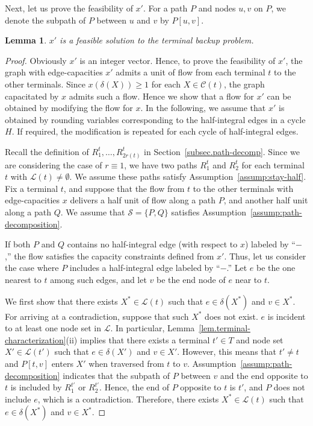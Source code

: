 \documentclass{article}
\newtheorem{lemma}{Lemma}
\newcommand{\Cfam}{\mathcal{C}}
\newcommand{\Lfam}{\mathcal{L}}
\newcommand{\Sfam}{\mathcal{S}}
\begin{document}
Next, let us prove the feasibility of $x'$.
For a path $P$ and nodes $u,v$ on $P$, we denote the subpath of $P$ between
$u$ and $v$ by $P[u,v]$.

\begin{lemma}\label{lem.feasibility-easy}
 $x'$ is a feasible solution to the terminal backup problem.
\end{lemma}
 \begin{proof}
  Obviously $x'$ is an integer vector. Hence, to prove the feasibility
  of $x'$, the graph with edge-capacities $x'$
  admits a unit of flow from each terminal $t$ to the other terminals.
  Since $x(\delta(X)) \geq 1$ for each $X \in \Cfam(t)$,
  the graph capacitated by $x$ admits such a flow.
  Hence we show that a flow for $x'$ can be obtained by
  modifying the flow for $x$.
  In the following, we assume that $x'$ is obtained by rounding variables
  corresponding to the half-integral edges in a cycle $H$.
  If required, the modification is repeated for each cycle of half-integral edges.

  Recall the definition of $R^t_1,\ldots,R^t_{2r(t)}$ in Section~\ref{subsec.path-decomp}.
  Since we are considering the case of $r\equiv 1$, we have two paths $R^t_1$ and
  $R^t_2$ for each terminal $t$ with $\Lfam(t)\neq \emptyset$.
  We assume these paths satisfy Assumption~\ref{assump:stay-half}.
  Fix a terminal $t$, and 
  suppose that the flow from $t$ to the other terminals
  with edge-capacities $x$ delivers a half unit of flow along a path $P$,
  and another half unit along a path $Q$.
  We assume that $\Sfam=\{P,Q\}$ satisfies Assumption~\ref{assump:path-decomposition}.

  If both $P$ and $Q$ contains no half-integral edge (with respect to $x$) labeled by
  ``$-$,''
  the flow satisfies the capacity constraints defined from $x'$.
  Thus, let us consider the case where $P$ includes a half-integral edge labeled
  by ``$-$.''
    Let $e$ be the one nearest to $t$ among such edges, and let $v$ be
  the end node of $e$ near to $t$.

  We first show that there exists $X^* \in \Lfam(t)$ such that $e \in
  \delta(X^*)$ and $v \in X^*$. For arriving at a contradiction,
  suppose that such $X^*$ does not exist.
  $e$ is incident to at least one node set in $\Lfam$.
  In particular, Lemma~\ref{lem.terminal-characterization}(ii)
  implies that there exists a terminal $t' \in T$ and node set $X' \in \Lfam(t')$ such that $e \in \delta(X')$ and
  $v \in X'$.
  However, this means that $t'\neq t$ and $P[t,v]$ enters $X'$ when traversed from
  $t$ to $v$.
  Assumption~\ref{assump:path-decomposition} indicates that
  the subpath of $P$ between $v$ and the end opposite to $t$ is included
  by
  $R^{t'}_1$ or $R^{t'}_2$. Hence,
  the end of $P$ opposite to $t$ is $t'$, and $P$ does not include
  $e$, which is a contradiction. Therefore,
  there exists $X^* \in \Lfam(t)$ such that $e \in
  \delta(X^*)$ and $v \in X^*$.


\end{proof}
\end{document}
